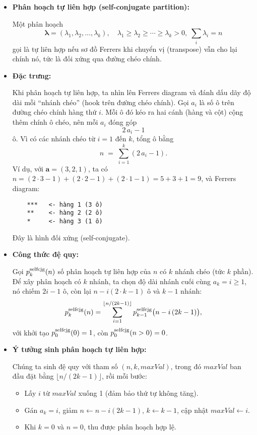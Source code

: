 \documentclass{article}
\begin{document}
\begin{itemize}
    \item \textbf{Phân hoạch tự liên hợp (self-conjugate partition):}
    
    Một phân hoạch 
    \[
      \boldsymbol\lambda = (\lambda_1,\lambda_2,\dots,\lambda_k),
      \quad
      \lambda_1\ge\lambda_2\ge\cdots\ge\lambda_k>0,
      \;\sum_i\lambda_i=n
    \]
    gọi là tự liên hợp nếu sơ đồ Ferrers khi chuyển vị (transpose) vẫn cho lại chính nó, tức là đối xứng qua đường chéo chính.

    \item \textbf{Đặc trưng:}
    
    Khi phân hoạch tự liên hợp, ta nhìn lên Ferrers diagram và đánh dấu dãy độ dài mỗi “nhánh chéo” (hook trên đường chéo chính). Gọi $a_i$ là số ô trên đường chéo chính hàng thứ $i$. Mỗi ô đó kéo ra hai cánh (hàng và cột) cộng thêm chính ô chéo, nên mỗi $a_i$ đóng góp
    \[
      2\,a_i - 1
    \]
    ô. Vì có các nhánh chéo từ $i=1$ đến $k$, tổng ô bằng
    \[
      n \;=\; \sum_{i=1}^k (2\,a_i - 1).
    \]
    Ví dụ, với $\boldsymbol a=(3,2,1)$, ta có $n= (2\cdot3-1)+(2\cdot2-1)+(2\cdot1-1)=5+3+1=9$, và Ferrers diagram:
    \begin{verbatim}
    ***   <- hàng 1 (3 ô)
    **    <- hàng 2 (2 ô)
    *     <- hàng 3 (1 ô)
    \end{verbatim}
    Đây là hình đối xứng (self-conjugate).

    \item \textbf{Công thức đệ quy:}

    Gọi $p_k^{\rm selfcjg}(n)$ số phân hoạch tự liên hợp của $n$ có $k$ nhánh chéo (tức $k$ phần).  
    Để xây phân hoạch có $k$ nhánh, ta chọn độ dài nhánh cuối cùng $a_k=i\ge1$, nó chiếm $2i-1$ ô, còn lại $n - i(2\cdot k -1)$ ô và $k-1$ nhánh:
    \[
      p_k^{\rm selfcjg}(n)
      = \sum_{i=1}^{\lfloor n/(2k-1)\rfloor}
        p_{k-1}^{\rm selfcjg}\bigl(n - i\,(2k-1)\bigr),
    \]
    với khởi tạo $p_0^{\rm selfcjg}(0)=1$, còn $p_0^{\rm selfcjg}(n>0)=0$.

    \item \textbf{Ý tưởng sinh phân hoạch tự liên hợp:}

    Chúng ta sinh đệ quy với tham số $(n,k,maxVal)$, trong đó $maxVal$ ban đầu đặt bằng $\lfloor n/(2k-1)\rfloor$, rồi mỗi bước:
    \begin{itemize}
        \item Lấy $i$ từ $maxVal$ xuống 1 (đảm bảo thứ tự không tăng).
        \item Gán $a_k=i$, giảm $n\leftarrow n - i(2k-1)$, $k\leftarrow k-1$, cập nhật $maxVal\leftarrow i$.
        \item Khi $k=0$ và $n=0$, thu được phân hoạch hợp lệ.
    \end{itemize}


\end{itemize}
\end{document}
